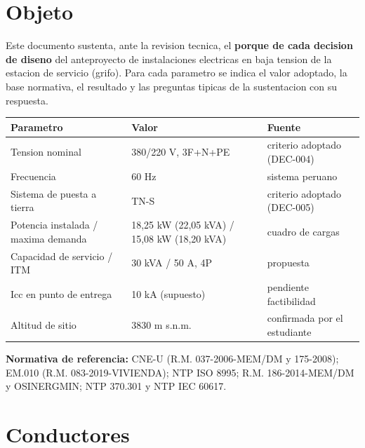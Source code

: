 \documentclass[12pt,letterpaper]{report}
\newcommand{\suheader}{\rowcolor{azulunap!14}}
\begin{document}
\hypersetup{pageanchor=false}

\clearpage
\hypersetup{pageanchor=true}

\pagestyle{memoria}
\renewcommand{\documentfootertext}{SUSTENTACION TECNICA - INSTALACIONES ELECTRICAS}

\section*{Objeto}
Este documento sustenta, ante la revision tecnica, el \textbf{porque de cada
decision de diseno} del anteproyecto de instalaciones electricas en baja
tension de la estacion de servicio (grifo). Para cada parametro se indica el
valor adoptado, la base normativa, el resultado y las preguntas tipicas de la
sustentacion con su respuesta.

\begin{table}[H]
\centering
\small
\renewcommand{\arraystretch}{1.12}
\begin{tabularx}{\textwidth}{P{0.32\textwidth} C{0.24\textwidth} L}
\toprule
\suheader \textbf{Parametro} & \textbf{Valor} & \textbf{Fuente} \\
\midrule
Tension nominal & 380/220 V, 3F+N+PE & criterio adoptado (DEC-004) \\
Frecuencia & 60 Hz & sistema peruano \\
Sistema de puesta a tierra & TN-S & criterio adoptado (DEC-005) \\
Potencia instalada / maxima demanda & 18,25 kW (22,05 kVA) / 15,08 kW (18,20 kVA) & cuadro de cargas \\
Capacidad de servicio / ITM & 30 kVA / 50 A, 4P & propuesta \\
Icc en punto de entrega & 10 kA (supuesto) & pendiente factibilidad \\
Altitud de sitio & 3830 m s.n.m. & confirmada por el estudiante \\
\bottomrule
\end{tabularx}
\end{table}

\textbf{Normativa de referencia:} CNE-U (R.M. 037-2006-MEM/DM y 175-2008); EM.010
(R.M. 083-2019-VIVIENDA); NTP ISO 8995; R.M. 186-2014-MEM/DM y OSINERGMIN; NTP
370.301 y NTP IEC 60617.

\section{Conductores}
\end{document}
